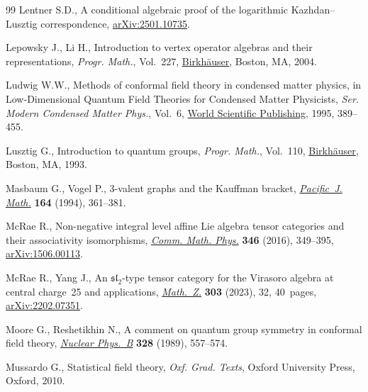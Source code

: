\documentclass[10pt,a4paper]{amsart}
\numberwithin{equation}{section}
\begin{document}
\begin{thebibliography}{99}
Lentner S.D., A conditional algebraic proof of the logarithmic
 {K}azhdan--{L}usztig correspondence,
 \href{http://arxiv.org/abs/2501.10735}{arXiv:2501.10735}.

Lepowsky J., Li H., Introduction to vertex operator algebras and their
 representations, \textit{Progr. Math.}, Vol.~227,
 \href{https://doi.org/10.1007/978-0-8176-8186-9}{Birkh\"auser}, Boston, MA,
 2004.

Ludwig W.W., Methods of conformal field theory in condensed matter physics, in
 Low-{D}imensional {Q}uantum {F}ield {T}heories for {C}ondensed {M}atter
 {P}hysicists, \textit{Ser. Modern Condensed Matter Phys.}, Vol.~6,
 \href{https://doi.org/10.1142/9789814447027_0007}{World Scientific
 Publishing}, 1995, 389--455.

Lusztig G., Introduction to quantum groups, \textit{Progr. Math.}, Vol.~110,
 \href{https://doi.org/10.1007/978-3-031-23817-8}{Birkh\"auser}, Boston, MA,
 1993.

Masbaum G., Vogel P., {$3$}-valent graphs and the {K}auffman bracket,
 \href{https://doi.org/10.2140/pjm.1994.164.361}{\textit{Pacific~J. Math.}}
 \textbf{164} (1994), 361--381.

McRae R., Non-negative integral level affine {L}ie algebra tensor categories
 and their associativity isomorphisms,
 \href{https://doi.org/10.1007/s00220-016-2683-y}{\textit{Comm. Math. Phys.}}
 \textbf{346} (2016), 349--395,
 \href{http://arxiv.org/abs/1506.00113}{arXiv:1506.00113}.

McRae R., Yang J., An {$\mathfrak{sl}_2$}-type tensor category for the
 {V}irasoro algebra at central charge~25 and applications,
 \href{https://doi.org/10.1007/s00209-022-03197-z}{\textit{Math.~Z.}}
 \textbf{303} (2023), 32, 40~pages,
 \href{http://arxiv.org/abs/2202.07351}{arXiv:2202.07351}.

Moore G., Reshetikhin N., A comment on quantum group symmetry in conformal
 field theory,
 \href{https://doi.org/10.1016/0550-3213(89)90219-8}{\textit{Nuclear Phys.~B}}
 \textbf{328} (1989), 557--574.

Mussardo G., Statistical field theory, \textit{Oxf. Grad. Texts}, Oxford University
 Press, Oxford, 2010.


\end{thebibliography}
\end{document}
